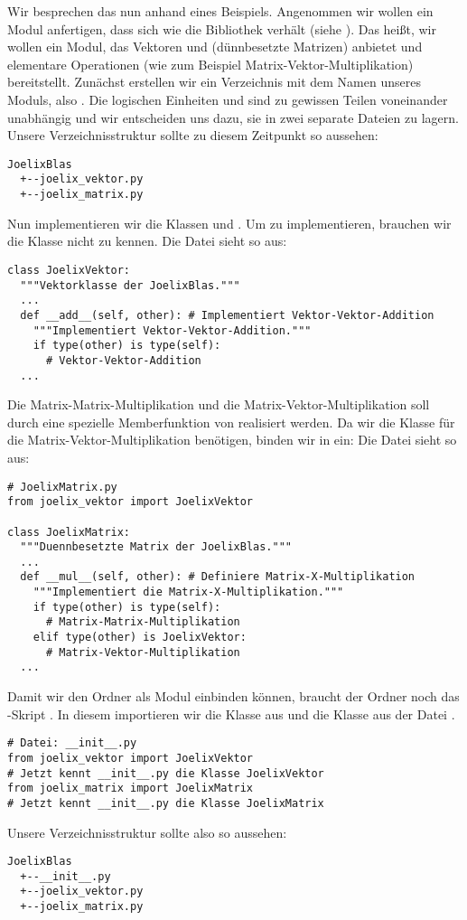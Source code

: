 Wir besprechen das nun anhand eines Beispiels.
Angenommen wir wollen ein Modul  anfertigen, dass sich wie die Bibliothek  verhält (siehe \cite{joelixC}).
Das heißt, wir wollen ein Modul, das Vektoren und (dünnbesetzte Matrizen) anbietet und elementare Operationen (wie zum Beispiel Matrix-Vektor-Multiplikation) bereitstellt.
Zunächst erstellen wir ein Verzeichnis mit dem Namen unseres Moduls, also .
Die logischen Einheiten  und  sind zu gewissen Teilen voneinander unabhängig und wir entscheiden uns dazu, sie in zwei separate Dateien zu lagern.
Unsere Verzeichnisstruktur sollte zu diesem Zeitpunkt so aussehen:
\begin{lstlisting}[language=plain]
JoelixBlas
  +--joelix_vektor.py
  +--joelix_matrix.py
\end{lstlisting}
Nun implementieren wir die Klassen  und .
Um  zu implementieren, brauchen wir die Klasse  nicht zu kennen.
Die Datei  sieht so aus:
\begin{lstlisting}
class JoelixVektor:
  """Vektorklasse der JoelixBlas."""
  ...
  def __add__(self, other): # Implementiert Vektor-Vektor-Addition
    """Implementiert Vektor-Vektor-Addition."""
    if type(other) is type(self):
      # Vektor-Vektor-Addition
  ...
\end{lstlisting}
Die Matrix-Matrix-Multiplikation und die Matrix-Vektor-Multiplikation soll durch eine spezielle Memberfunktion von  realisiert werden.
Da wir die Klasse  für die Matrix-Vektor-Multiplikation benötigen, binden wir  in  ein:
Die Datei  sieht so aus:
\begin{lstlisting}
# JoelixMatrix.py
from joelix_vektor import JoelixVektor

class JoelixMatrix:
  """Duennbesetzte Matrix der JoelixBlas."""
  ...
  def __mul__(self, other): # Definiere Matrix-X-Multiplikation
    """Implementiert die Matrix-X-Multiplikation."""
    if type(other) is type(self):
      # Matrix-Matrix-Multiplikation
    elif type(other) is JoelixVektor:
      # Matrix-Vektor-Multiplikation
  ...
\end{lstlisting}
Damit wir den Ordner  als Modul einbinden können, braucht der Ordner  noch das \Python-Skript .
In diesem importieren wir die Klasse  aus  und die Klasse  aus der Datei .
\begin{lstlisting}
# Datei: __init__.py
from joelix_vektor import JoelixVektor
# Jetzt kennt __init__.py die Klasse JoelixVektor
from joelix_matrix import JoelixMatrix
# Jetzt kennt __init__.py die Klasse JoelixMatrix
\end{lstlisting}
Unsere Verzeichnisstruktur sollte also so aussehen:
\begin{lstlisting}[language=plain]
JoelixBlas
  +--__init__.py
  +--joelix_vektor.py
  +--joelix_matrix.py
\end{lstlisting}


